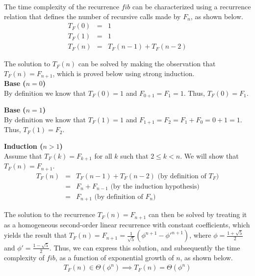 \documentclass[11pt]{article}
\begin{document}
\begin{prob}{1}
\end{prob}
\begin{sol} 

The time complexity of the recurrence $fib$ can be characterized using a recurrence relation that defines the number of recursive calls made by $F_{n}$, as shown below.
\begin{eqnarray*}
T_{F}(0) & = & 1 \\
T_{F}(1) & = & 1 \\
T_{F}(n) & = & T_{F}(n-1) + T_{F}(n-2)
\end{eqnarray*}

The solution to $T_{F}(n)$ can be solved by making the observation that $T_{F}(n) = F_{n+1}$, which is proved below using strong induction.\\

\textbf{Base ($n = 0$)} \\
By definition we know that $T_{F}(0) = 1$ and $F_{0 + 1} = F_{1} = 1$. Thus, $T_{F}(0) = F_{1}$.

\textbf{Base ($n = 1$)} \\
By definition we know that $T_{F}(1) = 1$ and $F_{1 + 1} = F_{2} = F_{1} + F_{0} = 0 + 1 = 1$. Thus, $T_{F}(1) = F_{2}$.

\textbf{Induction ($n > 1$)} \\
Assume that $T_{F}(k) = F_{k + 1}$ for all $k$ such that $2 \leq k < n$. We will show that $T_{F}(n) = F_{n + 1}$.
\begin{eqnarray*}
T_{F}(n) & = & T_{F}(n - 1) + T_{F}(n - 2) \text{ (by definition of $T_{F}$)} \\
& = & F_{n} + F_{n - 1} \text{ (by the induction hypothesis)} \\
& = & F_{n + 1} \text{ (by definition of $F_{n}$) }
\end{eqnarray*}

The solution to the recurrence $T_{F}(n) = F_{n+1}$ can then be solved by treating it as a homogeneous second-order linear recurrence with constant coefficients, which yields the result that $T_{F}(n) = F_{n+1} = \frac{1}{\sqrt{5}}(\phi^{n+1} - \phi'^{n+1})$, where $\phi = \frac{1 + \sqrt{5}}{2}$ and $\phi' = \frac{1 - \sqrt{5}}{2}$. Thus, we can express this solution, and subsequently the time complexity of $fib$, as a function of exponential growth of $n$, as shown below. 
\begin{eqnarray*}
T_{F}(n) \in \Theta(\phi^{n}) \implies T_{F}(n) = \Theta(\phi^{n})
\end{eqnarray*}


\end{sol}
\end{document}
